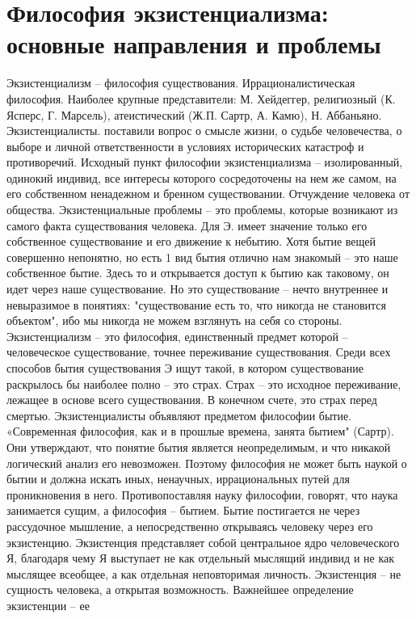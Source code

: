 \documentclass[12pt]{article}
\begin{document}
\section{Философия экзистенциализма: основные направления и проблемы}
Экзистенциализм – философия существования. Иррационалистическая философия.
Наиболее крупные представители: М. Хейдеггер, религиозный (К. Ясперс, Г. Марсель), атеистический (Ж.П. 
Сартр, А. Камю), Н. Аббаньяно.
Экзистенциалисты.  поставили  вопрос  о  смысле  жизни,  о  судьбе  человечества,  о  выборе  и  личной
ответственности в условиях исторических катастроф и противоречий.
Исходный пункт философии экзистенциализма – изолированный, одинокий индивид, все интересы которого
сосредоточены  на нем же  самом,  на его  собственном ненадежном  и  бренном  существовании.  Отчуждение
человека от общества.
Экзистенциальные проблемы – это проблемы, которые возникают из самого факта существования человека. Для
Э. имеет значение только его собственное существование и его движение к небытию.
Хотя бытие вещей совершенно непонятно, но есть 1 вид бытия отлично нам знакомый – это наше собственное
бытие. Здесь то и открывается доступ к бытию как таковому, он идет через наше существование. Но это
существование  –  нечто  внутреннее  и  невыразимое  в  понятиях:  "существование  есть  то,  что  никогда  не
становится объектом", ибо мы никогда не можем взглянуть на себя со стороны.
Экзистенциализм  –  это  философия,  единственный  предмет  которой  –  человеческое  существование,  точнее
переживание  существования.  Среди  всех  способов  бытия  существования  Э  ищут  такой,  в  котором
существование раскрылось бы наиболее полно – это страх. Страх – это исходное переживание, лежащее в
основе всего существования. В конечном счете, это страх перед смертью.
Экзистенциалисты  объявляют  предметом  философии  бытие.  «Современная  философия,  как  и  в  прошлые
времена, занята бытием" (Сартр). Они утверждают, что понятие бытия является неопределимым, и что никакой
логический анализ его невозможен. Поэтому философия не может быть наукой о бытии и должна искать иных,
ненаучных, иррациональных путей для проникновения в него. Противопоставляя науку философии, говорят, что
наука  занимается  сущим,  а  философия  –  бытием.  Бытие  постигается  не  через  рассудочное  мышление,  а
непосредственно открываясь человеку через его экзистенцию.
Экзистенция  представляет  собой  центральное  ядро  человеческого  Я,  благодаря  чему  Я  выступает  не  как
отдельный  мыслящий  индивид  и  не  как  мыслящее  всеобщее,  а  как  отдельная  неповторимая  личность.
Экзистенция – не сущность человека, а открытая возможность. Важнейшее определение экзистенции – ее
\end{document}
